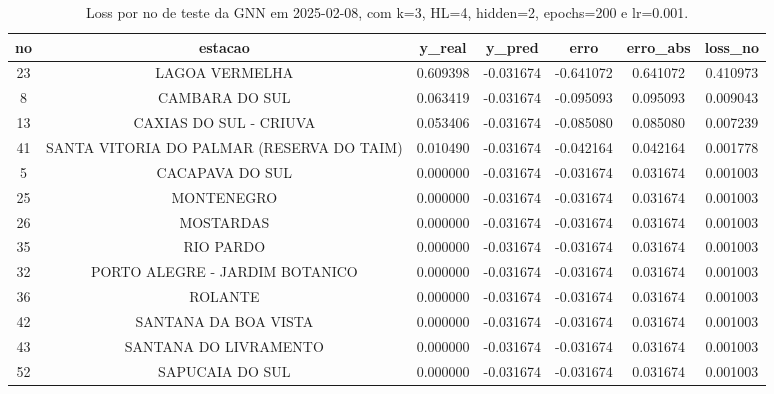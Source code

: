 \begin{table}[h]
\centering
\caption{Loss por no de teste da GNN em 2025-02-08, com k=3, HL=4, hidden=2, epochs=200 e lr=0.001.}
\label{tab:gnn_loss_k3_hl4_h2_e200_d20250208}
\begin{tabular}{ccccccc}
\toprule
no & estacao & y\_real & y\_pred & erro & erro\_abs & loss\_no \\
\midrule
23 & LAGOA VERMELHA & 0.609398 & -0.031674 & -0.641072 & 0.641072 & 0.410973 \\
8 & CAMBARA DO SUL & 0.063419 & -0.031674 & -0.095093 & 0.095093 & 0.009043 \\
13 & CAXIAS DO SUL - CRIUVA & 0.053406 & -0.031674 & -0.085080 & 0.085080 & 0.007239 \\
41 & SANTA VITORIA DO PALMAR (RESERVA DO TAIM) & 0.010490 & -0.031674 & -0.042164 & 0.042164 & 0.001778 \\
5 & CACAPAVA DO SUL & 0.000000 & -0.031674 & -0.031674 & 0.031674 & 0.001003 \\
25 & MONTENEGRO & 0.000000 & -0.031674 & -0.031674 & 0.031674 & 0.001003 \\
26 & MOSTARDAS & 0.000000 & -0.031674 & -0.031674 & 0.031674 & 0.001003 \\
35 & RIO PARDO & 0.000000 & -0.031674 & -0.031674 & 0.031674 & 0.001003 \\
32 & PORTO ALEGRE - JARDIM BOTANICO & 0.000000 & -0.031674 & -0.031674 & 0.031674 & 0.001003 \\
36 & ROLANTE & 0.000000 & -0.031674 & -0.031674 & 0.031674 & 0.001003 \\
42 & SANTANA DA BOA VISTA & 0.000000 & -0.031674 & -0.031674 & 0.031674 & 0.001003 \\
43 & SANTANA DO LIVRAMENTO & 0.000000 & -0.031674 & -0.031674 & 0.031674 & 0.001003 \\
52 & SAPUCAIA DO SUL & 0.000000 & -0.031674 & -0.031674 & 0.031674 & 0.001003 \\
\bottomrule
\end{tabular}
\end{table}
